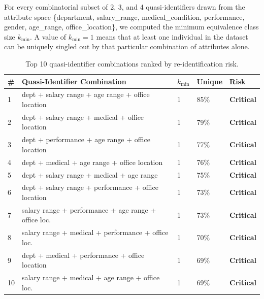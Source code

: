 \documentclass[12pt, a4paper]{report}
\begin{document}
For every combinatorial subset of 2, 3, and 4 quasi-identifiers drawn from the attribute space \{department, salary\_range, medical\_condition, performance, gender, age\_range, office\_location\}, we computed the minimum equivalence class size $k_{\min}$. A value of $k_{\min} = 1$ means that at least one individual in the dataset can be uniquely singled out by that particular combination of attributes alone.

\begin{table}[H]
\centering
\caption{Top 10 quasi-identifier combinations ranked by re-identification risk.}
\label{tab:kanon}
\footnotesize
{}
\begin{tabular}{C{0.6cm} L{7cm} C{0.8cm} C{1.3cm} C{1.3cm}}
\toprule
{}
\color{white}\textbf{\#} &
\color{white}\textbf{Quasi-Identifier Combination} &
\color{white}\textbf{$k_{\min}$} &
\color{white}\textbf{Unique} &
\color{white}\textbf{Risk} \\
  & dept + salary range + age range + office location        & 1 & 85\% & \textcolor{accent}{\textbf{Critical}} \\
2  & dept + salary range + medical + office location           & 1 & 79\% & \textcolor{accent}{\textbf{Critical}} \\
3  & dept + performance + age range + office location          & 1 & 77\% & \textcolor{accent}{\textbf{Critical}} \\
4  & dept + medical + age range + office location              & 1 & 76\% & \textcolor{accent}{\textbf{Critical}} \\
5  & dept + salary range + medical + age range                 & 1 & 75\% & \textcolor{accent}{\textbf{Critical}} \\
6  & dept + salary range + performance + office location       & 1 & 73\% & \textcolor{accent}{\textbf{Critical}} \\
7  & salary range + performance + age range + office loc.      & 1 & 73\% & \textcolor{accent}{\textbf{Critical}} \\
8  & salary range + medical + performance + office loc.        & 1 & 70\% & \textcolor{accent}{\textbf{Critical}} \\
9  & dept + medical + performance + office location            & 1 & 69\% & \textcolor{accent}{\textbf{Critical}} \\
10 & salary range + medical + age range + office loc.          & 1 & 69\% & \textcolor{accent}{\textbf{Critical}} \\
\bottomrule
\end{tabular}
\end{table}
\end{document}
